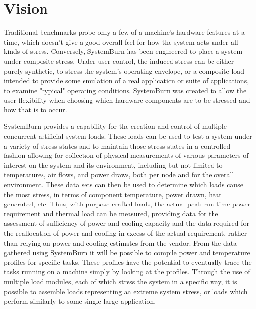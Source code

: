 \section{Vision}

Traditional benchmarks probe only a few of a machine's hardware features
at a time, which doesn't give a good overall feel for how the system acts
under all kinds of stress. Conversely, SystemBurn has been engineered to
place a system under composite stress. Under user-control, the induced
stress can be either purely synthetic, to stress the system's operating
envelope, or a composite load intended to provide some emulation of a real
application or suite of applications, to examine "typical" operating
conditions. SystemBurn was created to allow the user flexibility when
choosing which hardware components are to be stressed and how that is
to occur.

SystemBurn provides a capability for the creation and control
of multiple concurrent artificial system loads. These loads can be
used to test a system under a variety of stress states and to maintain
those stress states in a controlled fashion allowing for collection of
physical measurements of various parameters of interest on the system
and its environment, including but not limited to temperatures, air
flows, and power draws, both per node and for the overall environment.
These data sets can then be used to determine which loads cause the
most stress, in terms of component temperature, power drawn, heat
generated, etc. Thus, with purpose-crafted loads, the actual peak
run time power requirement and thermal load can be measured, providing
data for the assessment of sufficiency of power and cooling capacity and
the data required for the reallocation of power and cooling in excess
of the actual requirement, rather than relying on power and cooling
estimates from the vendor. From the data gathered using SystemBurn it
will be possible to compile power and temperature profiles for specific
tasks. These profiles have the potential to eventually trace the tasks
running on a machine simply by looking at the profiles. Through the use of
multiple load modules, each of which stress the system in a specific way,
it is possible to assemble loads representing an extreme system stress,
or loads which perform similarly to some single large application.

